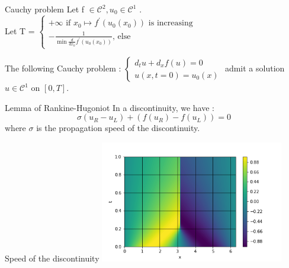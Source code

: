 \documentclass{beamer}
\begin{document}
            \begin{frame}{Cauchy problem}
                Let f $\in \mathscr{C}^2, u_0 \in \mathscr{C}^1$ .\\
                Let T =  
                $
                \begin{cases}
                    +\infty\text{ if $x_0 \mapsto f^\prime\left(u_0\left(x_0\right)\right)$ is increasing}\\
                    - \frac{1}{\min \frac{d}{dx_0}f^\prime\left(u_0\left(x_0\right)\right)}\text{, else}
                \end{cases}
                $
           
                The following Cauchy problem :
                $
                \begin{cases}
                     d_t u + d_x f\left(u\right) = 0 \\
                    u\left(x,t=0\right) = u_0\left(x\right)
                    \end{cases}
                $
                admit a solution $u \in \mathscr{C}^1$ on $[0,T ]$.
            \end{frame}
            
            \begin{frame}{Lemma of  Rankine-Hugoniot}
                In a discontinuity, we have :
                \begin{equation*}
                    \sigma\left(u_R-u_L\right) + \left(f\left(u_R\right) - f\left(u_L\right)\right)=0
                \end{equation*}
                where $\sigma$ is the propagation speed of the discontinuity.
            \end{frame}
            
            \begin{frame}{Speed of the discontinuity}
                \includegraphics[width=8cm]{limtlt.png}
            \end{frame}
            
\end{document}

